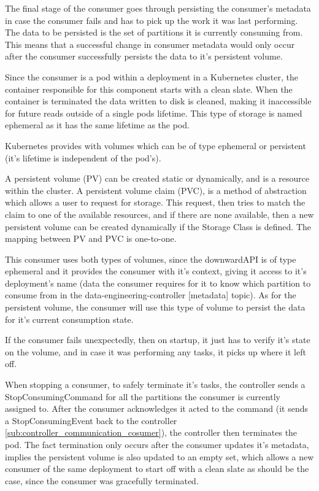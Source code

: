 The final stage of the consumer goes through persisting the consumer's metadata
in case the consumer fails and has to pick up the work it was last performing.
The data to be persisted is the set of partitions it is currently consuming
from. This means that a successful change in consumer metadata would only occur
after the consumer successfully persists the data to it's persistent volume.

Since the consumer is a pod within a deployment in a Kubernetes cluster, the
container responsible for this component starts with a clean slate. When the
container is terminated the data written to disk is cleaned,  making it
inaccessible for future reads outside of a single pods lifetime. This type of
storage is named ephemeral as it has the same lifetime as the pod.

Kubernetes provides with volumes which can be of type ephemeral or persistent
(it's lifetime is independent of the pod's). 

A persistent volume (PV) can be created static or dynamically, and is a resource
within the cluster. A persistent volume claim (PVC), is a method of abstraction
which allows a user to request for storage. This request, then tries to match
the claim to one of the available resources, and if there are none available,
then a new persistent volume can be created dynamically if the Storage Class is
defined. The mapping between PV and PVC is one-to-one.

This consumer uses both types of volumes, since the downwardAPI is of type
ephemeral and it provides the consumer with it's context, giving it access to
it's deployment's name (data the consumer requires for it to know which
partition to consume from in the data-engineering-controller [metadata] topic).
As for the persistent volume, the consumer will use this type of volume to
persist the data for it's current consumption state.

If the consumer fails unexpectedly, then on startup, it just has to verify it's
state on the volume, and in case it was performing any tasks, it picks up where
it left off.

When stopping a consumer, to safely terminate it's tasks, the controller sends a
StopConsumingCommand for all the partitions the consumer is currently assigned
to. After the consumer acknowledges it acted to the command (it sends a
StopConsumingEvent back to the controller
\ref{sub:controller_communication_cosumer}), the controller then terminates the
pod. The fact termination only occurs after the consumer updates it's metadata,
implies the persistent volume is also updated to an empty set, which allows a
new consumer of the same deployment to start off with a clean slate as should be
the case, since the consumer was gracefully terminated.


